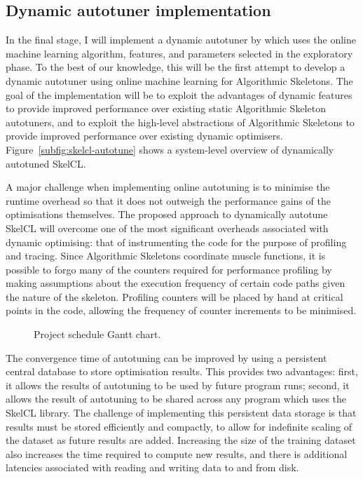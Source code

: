\subsection{Dynamic autotuner implementation}
In the final stage, I will implement a dynamic autotuner by which uses
the online machine learning algorithm, features, and parameters
selected in the exploratory phase. To the best of our knowledge, this
will be the first attempt to develop a dynamic autotuner using online
machine learning for Algorithmic Skeletons. The goal of the
implementation will be to exploit the advantages of dynamic features
to provide improved performance over existing static Algorithmic
Skeleton autotuners, and to exploit the high-level abstractions of
Algorithmic Skeletons to provide improved performance over existing
dynamic optimisers. Figure~\ref{subfig:skelcl-autotune} shows a
system-level overview of dynamically autotuned SkelCL.

A major challenge when implementing online autotuning is to minimise
the runtime overhead so that it does not outweigh the performance
gains of the optimisations themselves. The proposed approach to
dynamically autotune SkelCL will overcome one of the most significant
overheads associated with dynamic optimising: that of instrumenting
the code for the purpose of profiling and tracing. Since Algorithmic
Skeletons coordinate muscle functions, it is possible to forgo many of
the counters required for performance profiling by making assumptions
about the execution frequency of certain code paths given the nature
of the skeleton. Profiling counters will be placed by hand at critical
points in the code, allowing the frequency of counter increments to be
minimised.

\begin{figure*}[t!]
\makebox[\textwidth][c]{}
\caption{Project schedule Gantt chart.}
\label{fig:gantt}
\end{figure*}

The convergence time of autotuning can be improved by using a
persistent central database to store optimisation results. This
provides two advantages: first, it allows the results of autotuning to
be used by future program runs; second, it allows the result of
autotuning to be shared across any program which uses the SkelCL
library. The challenge of implementing this persistent data storage is
that results must be stored efficiently and compactly, to allow for
indefinite scaling of the dataset as future results are
added. Increasing the size of the training dataset also increases the
time required to compute new results, and there is additional
latencies associated with reading and writing data to and from disk.
